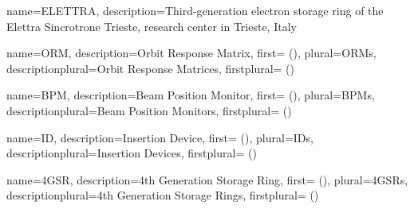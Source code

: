{
  name={ELETTRA},
  description={Third-generation electron storage ring of the Elettra Sincrotrone Trieste, research center in Trieste, Italy}
}




{
  name={ORM},
  description={Orbit Response Matrix},
  first={ ()},
  plural={ORMs},
  descriptionplural={Orbit Response Matrices},
  firstplural={ ()}
}

{
  name={BPM},
  description={Beam Position Monitor},
  first={ ()},
  plural={BPMs},
  descriptionplural={Beam Position Monitors},
  firstplural={ ()}
}

{
  name={ID},
  description={Insertion Device},
  first={ ()},
  plural={IDs},
  descriptionplural={Insertion Devices},
  firstplural={ ()}
}

{
  name={4GSR},
  description={4{th} Generation Storage Ring},
  first={ ()},
  plural={4GSRs},
  descriptionplural={4{th} Generation Storage Rings},
  firstplural={ ()}
}

